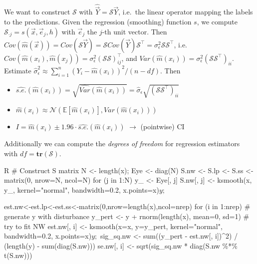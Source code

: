 \begin{sectionbox}\nospacing{}
  We want to construct $\mathcal{S}$ with $\hat{\vec{Y}} = \mathcal{S}\vec{Y}$, i.e.\ the linear operator mapping the labels to the predictions.
  Given the regression (smoothing) function $s$, we compute $\mathcal{S}_{\cdot j} = s(\vec{x}, \vec{e}_{j}, h)$ with $\vec{e}_{j}$ the $j$-th unit vector.
  Then $Cov(\hat m(\vec{x})) = Cov(\mathcal{S} \vec{Y}) = \mathcal{S} Cov(\vec{Y}) \mathcal{S}^{\top} = \sigma_{\epsilon}^{2}\mathcal{S}\mathcal{S}^{\top}$, i.e. $Cov(\hat m(x_{i}), \hat m(x_{j})) = \sigma_{\epsilon}^{2}{(\mathcal{S}\mathcal{S})}^{\top}_{ij}$, and $Var(\hat m(x_{i})) = \sigma_{\epsilon}^{2}{(\mathcal{S}\mathcal{S}^{\top})}_{ii}$.
  Estimate $\hat{\sigma}_{\epsilon}^{2} \approx \sum_{i=1}^{n}{(Y_{i} - \hat m(x_{i}))}^{2}/(n-df)$.
  Then
  \begin{itemize}
    \item $\widehat{s.e.}(\hat m(x_{i})) = \sqrt{\widehat{Var}(\hat m(x_{i}))} = \hat \sigma_{\epsilon} \sqrt{{(\mathcal{S}\mathcal{S}^{\top})}_{ii}}$
    \item $\hat m(x_{i}) \approx \mathcal{N}\left(\mathbb{E}[\hat m(x_{i})], Var(\hat m(x_{i}))\right)$
    \item $I = \hat m(x_{i}) \pm 1.96 \cdot \widehat{s.e.}(\hat m(x_{i}))$ $\rightarrow$ (pointwise) CI
  \end{itemize}

  Additionally we can compute the \emph{degrees of freedom} for regression estimators with $df = \mathbf{tr}(\mathcal{S})$.

  \begin{mintlinebox}{R}
# Construct S matrix
N <- length(x); Eye <- diag(N)
S.nw <- S.lp <- S.ss <- matrix(0, nrow=N, ncol=N)
for (j in 1:N) {
  y_ <- Eye[, j]
  S.nw[, j] <- ksmooth(x, y_, kernel="normal", bandwidth=0.2, x.points=x)$y ;$}

est.nw<-est.lp<-est.ss<-matrix(0,nrow=length(x),ncol=nrep)
for (i in 1:nrep) {
  # generate y with disturbance
  y_pert <- y + rnorm(length(x), mean=0, sd=1)
  # try to fit NW
  est.nw[, i] <- ksmooth(x=x, y=y_pert, kernel="normal", bandwidth=0.2, x.points=x)$y ;$
  sig_sq.nw <- sum((y_pert - est.nw[, i])^2) / (length(y) - sum(diag(S.nw)))
  se.nw[, i] <- sqrt(sig_sq.nw * diag(S.nw \%*\% t(S.nw)))}

  \end{mintlinebox}


\end{sectionbox}
